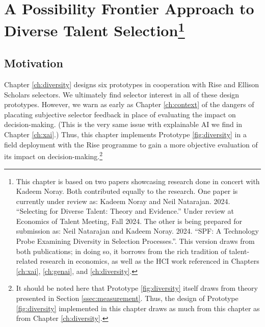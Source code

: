 \chapter[A Possibility Frontier Approach to Diverse Talent Selection]{\label{ch:spf}A Possibility Frontier Approach to Diverse Talent Selection\footnote{This chapter is based on two papers showcasing research done in concert with Kadeem Noray. Both contributed equally to the research. One paper is currently under review as: Kadeem Noray and Neil Natarajan. 2024. “Selecting for Diverse Talent: Theory and Evidence.” Under review at Economics of Talent Meeting, Fall 2024. The other is being prepared for submission as: Neil Natarajan and Kadeem Noray. 2024. “SPF: A Technology Probe Examining Diversity in Selection Processes.”. This version draws from both publications; in doing so, it borrows from the rich tradition of talent-related research in economics, as well as the HCI work referenced in Chapters \ref{ch:xai}, \ref{ch:genai}, and \ref{ch:diversity}.}}


\minitoc

\section{Motivation}
Chapter \ref{ch:diversity} designs six prototypes in cooperation with Rise and Ellison Scholars selectors. We ultimately find selector interest in all of these design prototypes. However, we warn as early as Chapter \ref{ch:context} of the dangers of placating subjective selector feedback in place of evaluating the impact on decision-making. (This is the very same issue with explainable AI we find in Chapter \ref{ch:xai}.) Thus, this chapter implements Prototype \ref{fig:diversity} in a field deployment with the Rise programme to gain a more objective evaluation of its impact on decision-making.\footnote{It should be noted here that Prototype \ref{fig:diversity} itself draws from theory presented in Section \ref{ssec:measurement}. Thus, the design of Prototype \ref{fig:diversity} implemented in this chapter draws as much from this chapter as from Chapter \ref{ch:diversity}.}

